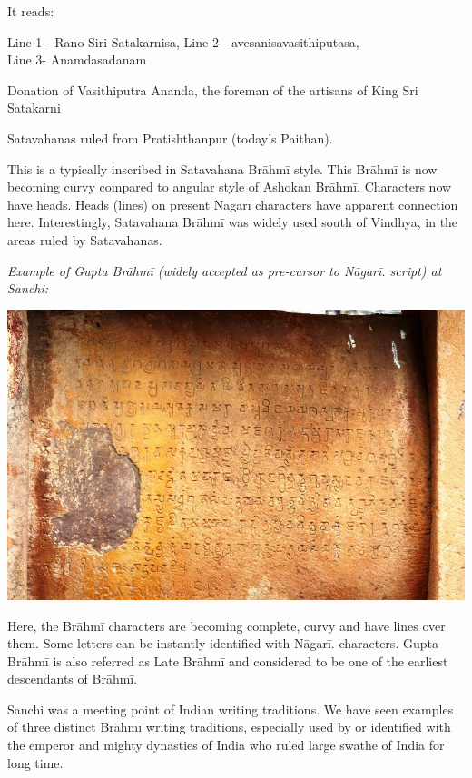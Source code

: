 It reads:

Line 1 - Rano Siri Satakarnisa, Line 2 - avesanisavasithiputasa,\\ Line 3- Anamdasadanam

Donation of Vasithiputra Ananda, the foreman of the artisans of King Sri Satakarni

Satavahanas ruled from Pratishthanpur (today’s Paithan).

This is a typically inscribed in Satavahana Brāhmī style. This Brāhmī is now becoming curvy compared to angular style of Ashokan Brāhmī. Characters now have heads. Heads (lines) on present Nāgarī characters have apparent connection here. Interestingly, Satavahana Brāhmī was widely used south of Vindhya, in the areas ruled by Satavahanas.

\textit{Example of Gupta Brāhmī (widely accepted as pre-cursor to Nāgarī. script) at Sanchi:}

\vskip 3.5pt

\centerline{\includegraphics[scale=0.15]{"images/article-06/art06-fig03.jpg"}}

Here, the Brāhmī characters are becoming complete, curvy and have lines over them. Some letters can be instantly identified with Nāgarī. characters. Gupta Brāhmī is also referred as Late Brāhmī and considered to be one of the earliest descendants of Brāhmī.

Sanchi was a meeting point of Indian writing traditions. We have seen examples of three distinct Brāhmī writing traditions, especially used by or identified with the emperor and mighty dynasties of India who ruled large swathe of India for long time.

